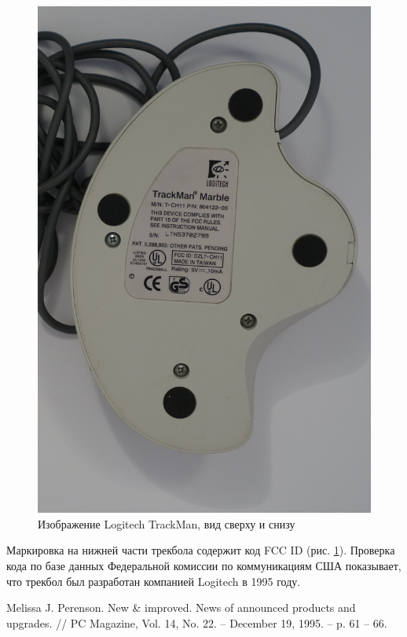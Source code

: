 \documentclass[11pt, a4paper]{article}
\begin{document}
\begin{figure}[h]
    \includegraphics[scale=0.5]{1995_logitech_trackman/2.17.JPG}
    \caption{Изображение Logitech TrackMan, вид сверху и снизу}
    \label{fig:trackmanTopAndBottom}
\end{figure}
    
    Маркировка на нижней части трекбола содержит код FCC ID (рис. \ref{fig:trackmanTopAndBottom}).
    Проверка кода по базе данных Федеральной комиссии по коммуникациям США показывает, что трекбол был разработан компанией Logitech в 1995 году.


\begin{thebibliography}{9}
 Melissa J. Perenson. New \& improved. News of announced products and upgrades. // PC Magazine, Vol. 14, No. 22. -- December 19, 1995. -- p. 61 -- 66.
\end{thebibliography}
\end{document}
